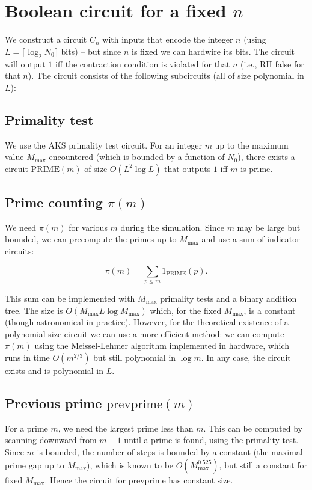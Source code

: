 \documentclass[11pt,a4paper]{article}
\begin{document}
\section{Boolean circuit for a fixed \(n\)}

We construct a circuit \(C_n\) with inputs that encode the integer \(n\) (using \(L = \lceil \log_2 N_0\rceil\) bits) – but since \(n\) is fixed we can hardwire its bits. The circuit will output \(1\) iff the contraction condition is violated for that \(n\) (i.e., RH false for that \(n\)). The circuit consists of the following subcircuits (all of size polynomial in \(L\)):

\subsection{Primality test}
We use the AKS primality test circuit. For an integer \(m\) up to the maximum value \(M_{\max}\) encountered (which is bounded by a function of \(N_0\)), there exists a circuit \(\mathrm{PRIME}(m)\) of size \(O(L^2 \log L)\) that outputs \(1\) iff \(m\) is prime.

\subsection{Prime counting \(\pi(m)\)}
We need \(\pi(m)\) for various \(m\) during the simulation. Since \(m\) may be large but bounded, we can precompute the primes up to \(M_{\max}\) and use a sum of indicator circuits:

\[
\pi(m) = \sum_{p\le m} 1_{\text{PRIME}}(p).
\]

This sum can be implemented with \(M_{\max}\) primality tests and a binary addition tree. The size is \(O(M_{\max} L \log M_{\max})\) which, for the fixed \(M_{\max}\), is a constant (though astronomical in practice). However, for the theoretical existence of a polynomial‑size circuit we can use a more efficient method: we can compute \(\pi(m)\) using the Meissel‑Lehmer algorithm implemented in hardware, which runs in time \(O(m^{2/3})\) but still polynomial in \(\log m\). In any case, the circuit exists and is polynomial in \(L\).

\subsection{Previous prime \(\mathrm{prevprime}(m)\)}
For a prime \(m\), we need the largest prime less than \(m\). This can be computed by scanning downward from \(m-1\) until a prime is found, using the primality test. Since \(m\) is bounded, the number of steps is bounded by a constant (the maximal prime gap up to \(M_{\max}\)), which is known to be \(O(M_{\max}^{0.525})\), but still a constant for fixed \(M_{\max}\). Hence the circuit for prevprime has constant size.
\end{document}
